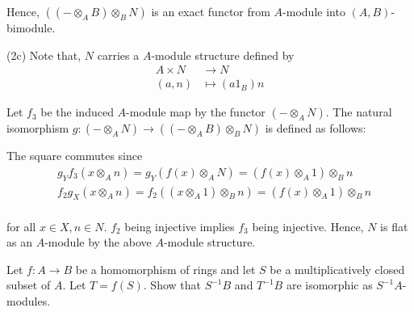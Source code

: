 \begin{longproof}
	Hence, $((- \otimes_A B) \otimes_B N)$ is an exact functor from $A$-module into $(A,B)$-bimodule.
	
	(2c) Note that, $N$ carries a $A$-module structure defined by
	\begin{align*}
		A \times N &\to N \\
		(a, n) &\mapsto (a 1_B) n
	\end{align*}
	
	Let $f_3$ be the induced $A$-module map by the functor $(- \otimes_A N)$. The natural isomorphism $g: (- \otimes_A N) \to ((- \otimes_A B) \otimes_B N)$ is defined as follows:

	\begin{center}
	\end{center}
	
	The square commutes since
	\begin{align*}
		&g_Y f_3 (x \otimes_A n) = g_Y (f(x) \otimes_A N) = (f(x) \otimes_A 1) \otimes_B n \\
		&f_2 g_X (x \otimes_A n) = f_2((x \otimes_A 1) \otimes_B n) = (f(x) \otimes_A 1) \otimes_B n \\
	\end{align*}
	
	for all $x \in X, n \in N$. $f_2$ being injective implies $f_3$ being injective. Hence, $N$ is flat as an $A$-module by the above $A$-module structure.
\end{longproof}

\begin{problem}
	Let $f: A \to B$ be a homomorphism of rings and let $S$ be a multiplicatively closed subset of $A$. Let $T = f(S)$. Show that $S^{-1} B$ and $T^{-1} B$ are isomorphic as $S^{-1} A$-modules.
\end{problem}

